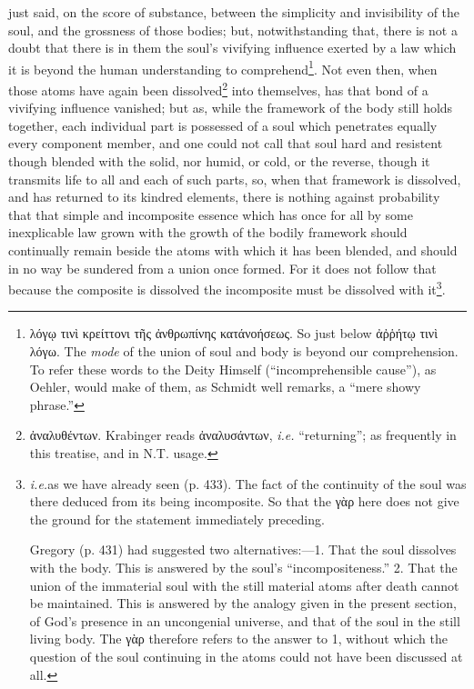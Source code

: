 just said, on the score of substance, between the simplicity and invisibility of the soul, and the grossness of those bodies; but, notwithstanding that, there is not a doubt that there is in them the soul’s vivifying influence exerted by a law which it is beyond the human understanding to comprehend\footnote{\textgreek{λόγῳ τινὶ κρείττονι τῆς ἀνθρωπίνης κατάνοήσεως}. So just below \textgreek{ἀῤῥήτῳ τινὶ λόγω}. The \emph{mode} of the union of soul and body is beyond our comprehension. To refer these words to the Deity Himself (“incomprehensible cause”), as Oehler, would make of them, as Schmidt well remarks, a “mere showy phrase.”}. Not even then, when those atoms have again been dissolved\footnote{\textgreek{ἀναλυθέντων}. Krabinger reads \textgreek{ἀναλυσάντων}, \emph{i.e.} “returning”; as frequently in this treatise, and in N.T. usage.} into themselves, has that bond of a vivifying influence vanished; but as, while the framework of the body still holds together, each individual part is possessed of a soul which penetrates equally every component member, and one could not call that soul hard and resistent though blended with the solid, nor humid, or cold, or the reverse, though it transmits life to all and each of such parts, so, when that framework is dissolved, and has returned to its kindred elements, there is nothing against probability that that simple and incomposite essence which has once for all by some inexplicable law grown with the growth of the bodily framework should continually remain beside the atoms with which it has been blended, and should in no way be sundered from a union once formed. For it does not follow that because the composite is dissolved the incomposite must be dissolved with it\footnote{\emph{i.e.}as we have already seen (p. 433). The fact of the continuity of the soul was there deduced from its being incomposite. So that the \textgreek{γὰρ} here does not give the ground for the statement immediately preceding. \par Gregory (p. 431) had suggested two alternatives:—1. That the soul dissolves with the body. This is answered by the soul’s “incompositeness.” 2. That the union of the immaterial soul with the still material atoms after death cannot be maintained. This is answered by the analogy given in the present section, of God’s presence in an uncongenial universe, and that of the soul in the still living body. The \textgreek{γὰρ} therefore refers to the answer to 1, without which the question of the soul continuing in the atoms could not have been discussed at all.}.

